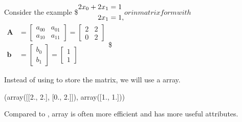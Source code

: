 \documentclass[letterpaper,10pt,english]{sphinxmanual}
\begin{document}
Consider the example
\$\( \begin{aligned}
2x_0 + 2x_1 &= 1\\
\hphantom{2x_0 +}  2x_1 &= 1,
\end{aligned}\)\(
or in matrix form with
\)\( \begin{aligned}
\mathbf{A}&=\begin{bmatrix}
a_{00} & a_{01} \\
a_{10} & a_{11} 
\end{bmatrix} 
= \begin{bmatrix}
2 & 2 \\
0 & 2 
\end{bmatrix}\\
\mathbf{b}&=\begin{bmatrix}
b_0\\
b_1
\end{bmatrix} = \begin{bmatrix}
1\\
1
\end{bmatrix}\end{aligned}\)\$

Instead of using  to store the matrix, we will use a  array.

\begin{sphinxVerbatim}[commandchars=\\\{\}]
  \PYG{p}{[}\PYG{p}{[}\PYG{p}{]}\PYG{p}{[}\PYG{p}{]}\PYG{p}{]}
  \PYG{p}{[}\PYG{p}{]}
 
\end{sphinxVerbatim}

\begin{sphinxVerbatim}[commandchars=\\\{\}]
(array([[2., 2.],
        [0., 2.]]),
 array([1., 1.]))
\end{sphinxVerbatim}

Compared to ,  array is often more efficient and has more useful attributes.
\end{document}
